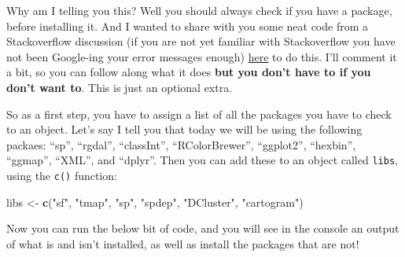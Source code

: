 \documentclass[]{book}
\newenvironment{Shaded}{\begin{snugshade}}{\end{snugshade}}
\newcommand{\CommentTok}[1]{\textcolor[rgb]{0.56,0.35,0.01}{\textit{#1}}}
\newcommand{\ControlFlowTok}[1]{\textcolor[rgb]{0.13,0.29,0.53}{\textbf{#1}}}
\newcommand{\DataTypeTok}[1]{\textcolor[rgb]{0.13,0.29,0.53}{#1}}
\newcommand{\KeywordTok}[1]{\textcolor[rgb]{0.13,0.29,0.53}{\textbf{#1}}}
\newcommand{\NormalTok}[1]{#1}
\newcommand{\OperatorTok}[1]{\textcolor[rgb]{0.81,0.36,0.00}{\textbf{#1}}}
\newcommand{\OtherTok}[1]{\textcolor[rgb]{0.56,0.35,0.01}{#1}}
\newcommand{\StringTok}[1]{\textcolor[rgb]{0.31,0.60,0.02}{#1}}
\begin{document}
Why am I telling you this? Well you should always check if you have a package, before installing it. And I wanted to share with you some neat code from a Stackoverflow discussion (if you are not yet familiar with Stackoverflow you have not been Google-ing your error messages enough) \href{https://stackoverflow.com/questions/4090169/elegant-way-to-check-for-missing-packages-and-install-them}{here} to do this. I'll comment it a bit, so you can follow along what it does \textbf{but you don't have to if you don't want to}. This is just an optional extra.

So as a first step, you have to assign a list of all the packages you have to check to an object. Let's say I tell you that today we will be using the following packaes: ``sp'', ``rgdal'', ``classInt'', ``RColorBrewer'', ``ggplot2'', ``hexbin'', ``ggmap'', ``XML'', and ``dplyr''. Then you can add these to an object called \texttt{libs}, using the \texttt{c()} function:

\begin{Shaded}
\begin{Highlighting}[]
\NormalTok{libs <-}\StringTok{ }\KeywordTok{c}\NormalTok{(}\StringTok{"sf"}\NormalTok{, }\StringTok{"tmap"}\NormalTok{, }\StringTok{"sp"}\NormalTok{, }\StringTok{"spdep"}\NormalTok{, }\StringTok{"DCluster"}\NormalTok{, }\StringTok{"cartogram"}\NormalTok{)}
\end{Highlighting}
\end{Shaded}

Now you can run the below bit of code, and you will see in the console an output of what is and isn't installed, as well as install the packages that are not!

\begin{Shaded}
\end{Shaded}
\end{document}
